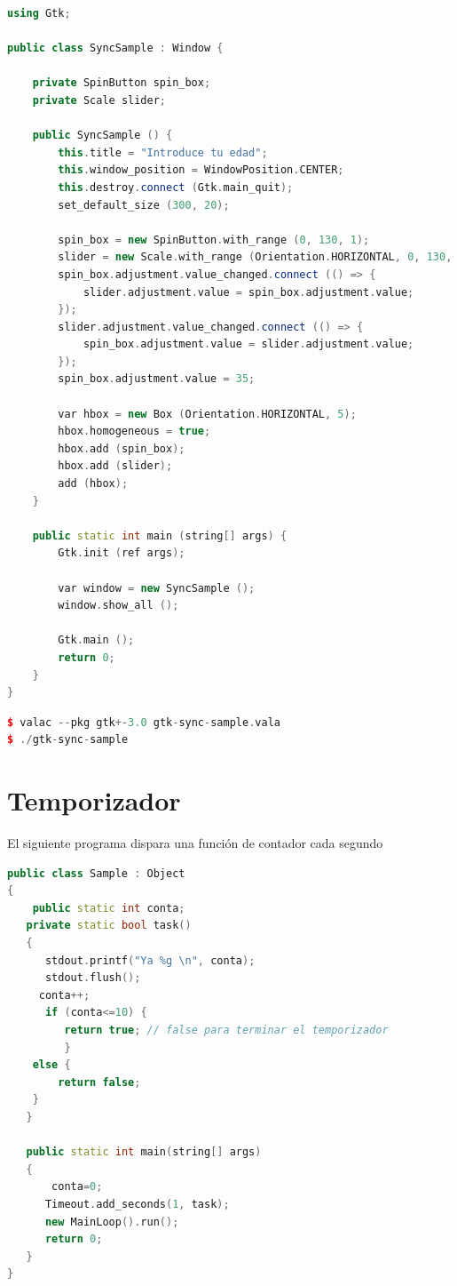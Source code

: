 \documentclass[12pt,twoside]{book}
\begin{document}
\begin{lstlisting}[language=C++]
using Gtk;

public class SyncSample : Window {

    private SpinButton spin_box;
    private Scale slider;

    public SyncSample () {
        this.title = "Introduce tu edad";
        this.window_position = WindowPosition.CENTER;
        this.destroy.connect (Gtk.main_quit);
        set_default_size (300, 20);

        spin_box = new SpinButton.with_range (0, 130, 1);
        slider = new Scale.with_range (Orientation.HORIZONTAL, 0, 130, 1);
        spin_box.adjustment.value_changed.connect (() => {
            slider.adjustment.value = spin_box.adjustment.value;
        });
        slider.adjustment.value_changed.connect (() => {
            spin_box.adjustment.value = slider.adjustment.value;
        });
        spin_box.adjustment.value = 35;

        var hbox = new Box (Orientation.HORIZONTAL, 5);
        hbox.homogeneous = true;
        hbox.add (spin_box);
        hbox.add (slider);
        add (hbox);
    }

    public static int main (string[] args) {
        Gtk.init (ref args);

        var window = new SyncSample ();
        window.show_all ();

        Gtk.main ();
        return 0;
    }
}
\end{lstlisting}

\begin{lstlisting}[language=C++]
$ valac --pkg gtk+-3.0 gtk-sync-sample.vala
$ ./gtk-sync-sample
\end{lstlisting}

\section{Temporizador}

El siguiente programa dispara una función de contador cada segundo

\begin{lstlisting}[language=C++]
public class Sample : Object
{
	public static int conta;
   private static bool task()
   {
      stdout.printf("Ya %g \n", conta);
      stdout.flush();
  	 conta++;    
      if (conta<=10) {
		 return true; // false para terminar el temporizador
		 }
	else {
		return false;
	}
   }

   public static int main(string[] args)
   {
	   conta=0;
      Timeout.add_seconds(1, task);
      new MainLoop().run();
      return 0;
   }
}
\end{lstlisting}
\end{document}
